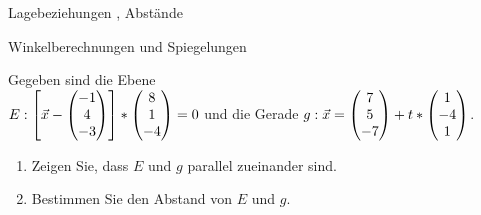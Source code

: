 

\usepackage{xfrac}


\begin{inhalt}
	\item Lagebeziehungen , Abstände 
	\item Winkelberechnungen und Spiegelungen 
\end{inhalt}


Gegeben sind die Ebene \\$E: \left[ \vec x -  \begin{pmatrix} -1 \\ 4\\ -3 \end{pmatrix}\right]*\begin{pmatrix} 8\\ 1 \\-4 \end{pmatrix}=0$ und die Gerade $g: \vec x=\begin{pmatrix} 7\\5\\-7 \end{pmatrix}+t*\begin{pmatrix} 1\\-4\\1 \end{pmatrix}$.
\begin{enumerate}
	\item Zeigen Sie, dass $E$ und $g$ parallel zueinander sind.
	\item Bestimmen Sie den Abstand von $E$ und $g$.
\end{enumerate}

